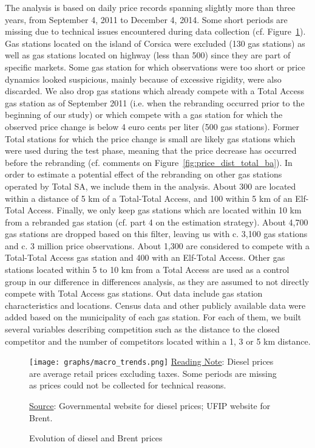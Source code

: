 \documentclass[english]{article}
\begin{document}
The analysis is based on daily price records spanning slightly more than three years, from September 4, 2011 to December 4, 2014. Some short periods are missing due to technical issues encountered during data collection (cf. Figure~\ref{fig:diesel_and_brent}). Gas stations located on the island of Corsica were excluded (130 gas stations) as well as gas stations located on highway (less than 500) since they are part of specific markets. Some gas station for which observations were too short or price dynamics looked suspicious, mainly because of excessive rigidity, were also discarded. We also drop gas stations which already compete with a Total Access gas station as of September 2011 (i.e. when the rebranding occurred prior to the beginning of our study) or which compete with a gas station for which the observed price change is below 4 euro cents per liter (500 gas stations). Former Total stations for which the price change is small are likely gas stations which were used during the test phase, meaning that the price decrease has occurred before the rebranding (cf. comments on Figure~\ref{fig:price_dist_total_ba}). In order to estimate a potential effect of the rebranding on other gas stations operated by Total SA, we include them in the analysis. About 300 are located within a distance of 5 km of a Total-Total Access, and 100 within 5 km of an Elf-Total Access. Finally, we only keep gas stations which are located within 10 km from a rebranded gas station (cf. part 4 on the estimation strategy). About 4,700 gas stations are dropped based on this filter, leaving us with c. 3,100 gas stations and c. 3 million price observations. About 1,300 are considered to compete with a Total-Total Access gas station and 400 with an Elf-Total Access. Other gas stations located within 5 to 10 km from a Total Access are used as a control group in our difference in differences analysis, as they are assumed to not directly compete with Total Access gas stations. Out data include gas station characteristics and locations. Census data and other publicly available data were added based on the municipality of each gas station. For each of them, we built several variables describing competition such as the distance to the closed competitor and the number of competitors located within a 1, 3 or 5 km distance.
\medskip{}

\begin{figure}[H]
    \caption{Evolution of diesel and Brent prices}
		\label{fig:diesel_and_brent}
\texttt{[image: graphs/macro\_trends.png]}
\flushleft
{\small{}\uline{Reading Note}}{\small{}:
Diesel prices are average retail prices excluding taxes. Some periods are missing as prices could not be collected for technical reasons.}{\small \par}
{\small{}\uline{Source}}{\small{}: Governmental website for diesel prices; UFIP website for Brent.}\medskip{}
\end{figure}
\end{document}
